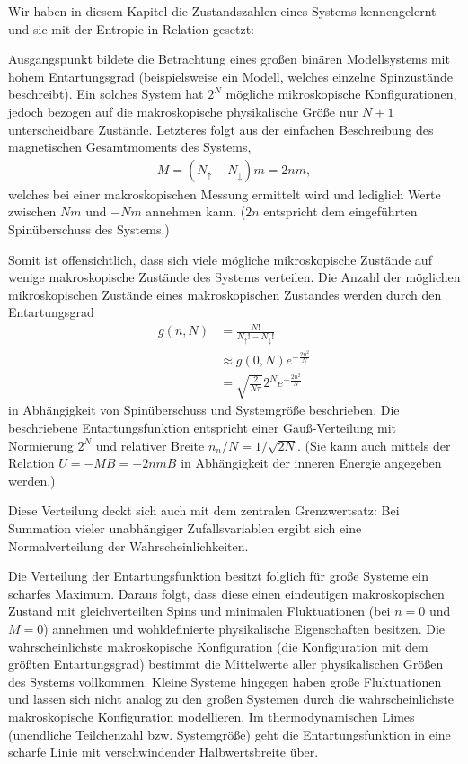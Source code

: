 \begin{summary}
    Wir haben in diesem Kapitel die Zustandszahlen eines Systems kennengelernt und sie mit der Entropie in Relation gesetzt:

    Ausgangspunkt bildete die Betrachtung eines großen binären Modellsystems mit hohem Entartungsgrad (beispielsweise ein Modell, welches einzelne Spinzustände beschreibt).
    Ein solches System hat $2^N$ mögliche mikroskopische Konfigurationen, jedoch \textendash{} bezogen auf die makroskopische physikalische Größe \textendash{} nur $N+1$ unterscheidbare Zustände. Letzteres folgt aus der einfachen Beschreibung des magnetischen Gesamtmoments des Systems, 
     \begin{align*}
        M=(N_\uparrow-N_\downarrow)m=2nm,
    \end{align*}
    welches bei einer makroskopischen Messung ermittelt wird und lediglich Werte zwischen $Nm$ und $-Nm$ annehmen kann. ($2n$ entspricht dem eingeführten Spinüberschuss des Systems.)

    Somit ist offensichtlich, dass sich viele mögliche mikroskopische Zustände auf wenige makroskopische Zustände des Systems verteilen. Die Anzahl der möglichen mikroskopischen Zustände eines makroskopischen Zustandes werden durch den Entartungsgrad 
    \begin{align*}
        g(n,N)&=\frac{N!}{N_\uparrow!-N_\downarrow!}\\&\approx g(0,N)e^{-\frac{2n^2}{N}}\\&=\sqrt{\frac{2}{N\pi}}2^Ne^{-\frac{2n^2}{N}}
    \end{align*}
    in Abhängigkeit von Spinüberschuss und Systemgröße beschrieben. Die beschriebene Entartungsfunktion entspricht einer Gauß-Verteilung mit Normierung $2^N$ und relativer Breite $n_n/N=1/\sqrt{2N}$. (Sie kann auch mittels der Relation $U=-MB=-2nmB$ in Abhängigkeit der inneren Energie angegeben werden.)

    Diese Verteilung deckt sich auch mit dem zentralen Grenzwertsatz: Bei Summation vieler unabhängiger Zufallsvariablen ergibt sich eine Normalverteilung der Wahrscheinlichkeiten.

    Die Verteilung der Entartungsfunktion besitzt folglich für große Systeme ein scharfes Maximum. Daraus folgt, dass diese einen eindeutigen makroskopischen Zustand mit gleichverteilten Spins und minimalen Fluktuationen (bei $n=0$ und $M=0$) annehmen und wohldefinierte physikalische Eigenschaften besitzen. Die wahrscheinlichste makroskopische Konfiguration (die Konfiguration mit dem größten Entartungsgrad) bestimmt die Mittelwerte aller physikalischen Größen des Systems vollkommen. 
    Kleine Systeme hingegen haben große Fluktuationen und lassen sich nicht analog zu den großen Systemen durch die wahrscheinlichste makroskopische Konfiguration modellieren.
    Im thermodynamischen Limes (unendliche Teilchenzahl bzw. Systemgröße) geht die Entartungsfunktion in eine scharfe Linie mit verschwindender Halbwertsbreite über. 
      

\end{summary}
